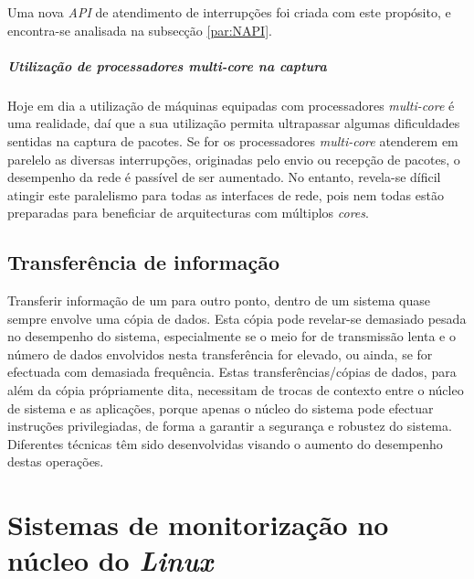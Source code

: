 Uma nova \textit{API} de atendimento de interrupções foi criada com este propósito, e encontra-se analisada na subsecção \ref{par:NAPI}.

\subparagraph*{Utilização de processadores \textit{multi-core} na captura}
Hoje em dia a utilização de máquinas equipadas com processadores \textit{multi-core} é uma realidade, daí que a sua utilização permita ultrapassar algumas dificuldades sentidas na captura de pacotes.
Se for os processadores \textit{multi-core} atenderem em parelelo as diversas interrupções, originadas pelo envio ou recepção de pacotes, o desempenho da rede é passível de ser aumentado.
No entanto, revela-se díficil atingir este paralelismo para todas as interfaces de rede, pois nem todas estão preparadas para beneficiar de arquitecturas com múltiplos \textit{cores}.


\subsection{Transferência de informação}\label{sect:transf_information}


Transferir informação de um para outro ponto, dentro de um sistema quase sempre envolve uma cópia de dados.
Esta cópia pode revelar-se demasiado pesada no desempenho do sistema, especialmente se o meio for de transmissão lenta e o número de dados envolvidos nesta transferência for elevado, ou ainda, se for efectuada com demasiada frequência.
Estas transferências/cópias de dados, para além da cópia própriamente dita, necessitam de trocas de contexto entre o núcleo de sistema e as aplicações, porque apenas o núcleo do sistema pode efectuar instruções privilegiadas, de forma a garantir a segurança e robustez do sistema.
Diferentes técnicas têm sido desenvolvidas visando o aumento do desempenho destas operações. 

\section{Sistemas de monitorização no núcleo do \textit{Linux}}\label{sect:instrumentacao_casos_linux}

